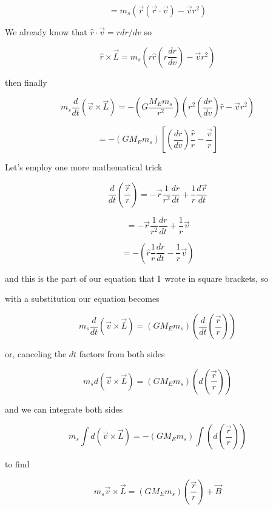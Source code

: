 $$=m_{s}\left( \overrightarrow{r}\left( \overrightarrow{r}\cdot \overrightarrow{v}\right) -\overrightarrow{v}r^{2}\right) $$


We already know that $\hat{r}\cdot \overrightarrow{v}=rdr/dv$ so 

$$\hat{r}\times \overrightarrow{L}=m_{s}\left( r\hat{r}\left( r\frac{dr}{dv}\right) -\overrightarrow{v}r^{2}\right) $$

then finally 

$$ m_{s}\frac{d}{dt}\left( \overrightarrow{v}\times \overrightarrow{L}\right)=-\left( G\frac{M_{E}m_{s}}{r^{2}}\right) \left( r^{2}\left( \frac{dr}{dv}\right) \hat{r}-\overrightarrow{v}r^{2}\right) 
$$

$$=-\left( GM_{E}m_{s}\right) \left[ \left( \frac{dr}{dv}\right) \frac{\hat{r}}{r}-\frac{\overrightarrow{v}}{r}\right] $$


Let's employ one more mathematical trick%

$$\frac{d}{dt}\left( \frac{\overrightarrow{r}}{r}\right) =-\overrightarrow{r} \frac{1}{r^{2}}\frac{dr}{dt}+\frac{1}{r}\frac{d\overrightarrow{r}}{dt}
$$

$$=-\overrightarrow{r}\frac{1}{r^{2}}\frac{dr}{dt}+\frac{1}{r}\overrightarrow{v}
$$

$$=-\left( \hat{r}\frac{1}{r}\frac{dr}{dt}-\frac{1}{r}\overrightarrow{v}\right)$$

and this is the part of our equation that I\ wrote in square brackets, so

with a substitution our equation becomes%

$$m_{s}\frac{d}{dt}\left( \overrightarrow{v}\times \overrightarrow{L}\right)=\left( GM_{E}m_{s}\right) \left( \frac{d}{dt}\left( \frac{\overrightarrow{r}}{r}\right) \right) $$

or, canceling the $dt$ factors from both sides%

$$m_{s}d\left( \overrightarrow{v}\times \overrightarrow{L}\right) =\left(GM_{E}m_{s}\right) \left( d\left( \frac{\overrightarrow{r}}{r}\right)\right)
$$

and we can integrate both sides%

$$m_{s}\int d\left( \overrightarrow{v}\times \overrightarrow{L}\right)=-\left( GM_{E}m_{s}\right) \int \left( d\left( \frac{\overrightarrow{r}}{r}\right) \right)
$$

to find 

$$m_{s}\overrightarrow{v}\times \overrightarrow{L}=\left( GM_{E}m_{s}\right)\left( \frac{\overrightarrow{r}}{r}\right) +\overrightarrow{B}
$$

